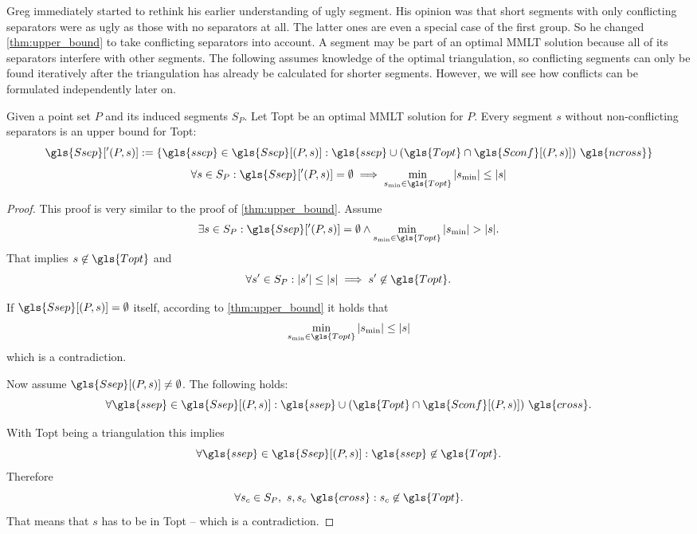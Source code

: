 Greg immediately started to rethink his earlier understanding of ugly
segment. His opinion was that short segments with only conflicting
separators were as ugly as those with no separators at all. The latter
ones are even a special case of the first group. So he changed
\cref{thm:upper_bound} to take conflicting separators into account. A 
segment may be part of an optimal \gls{MMLT} solution because all of
its separators interfere with other segments. The following
assumes knowledge of the optimal triangulation, so conflicting segments 
can only be found iteratively after the triangulation has already be 
calculated for shorter segments. However, we will see how conflicts can 
be formulated independently later on.

\begin{theorem}\label{thm:tight_upper_bound}
  Given a point set \(P\) and its induced segments \(S_P\). Let
  \gls{Topt} be an optimal \gls{MMLT} solution for \(P\).
  Every segment \(s\) without non-conflicting separators is an upper
  bound for \gls{Topt}:
  \[
    \gls{Ssep}['(P,s)] := 
    \{
      \gls{ssep} \in \gls{Ssep}[(P,s)] : 
      \gls{ssep} \cup (\gls{Topt} \cap \gls{Sconf}[(P,s)])~\gls{ncross}
    \}
  \]
  \[
    \forall s \in S_P : \gls{Ssep}['(P,s)] = \emptyset \implies
    \min\limits_{s_{\min} \in \gls{Topt}} |s_{\min}| \leq |s|
  \]
\end{theorem}


\begin{proof}
  This proof is very similar to the proof of \cref{thm:upper_bound}.
  Assume
  \[
    \exists s \in S_P :
    \gls{Ssep}['(P,s)] = \emptyset
    \land \min\limits_{s_{\min} \in \gls{Topt}} |s_{\min}| > |s|.
  \]
  That implies \(s \not\in \gls{Topt}\) and
  \[
    \forall s' \in S_P : |s'| \leq |s| \implies s' \not\in \gls{Topt}.
  \]
  
  If \(\gls{Ssep}[(P,s)] = \emptyset\) itself, according to
  \cref{thm:upper_bound} it holds that
  \[ \min\limits_{s_{\min} \in \gls{Topt}} |s_{\min}| \leq |s|\]
  which is a contradiction.
  
  Now assume \(\gls{Ssep}[(P,s)] \not= \emptyset\). The
  following holds:
  \[
    \forall \gls{ssep} \in \gls{Ssep}[(P,s)] :
    \gls{ssep} \cup (\gls{Topt} \cap \gls{Sconf}[(P,s)])~\gls{cross}.
  \]
  
  With \gls{Topt} being a triangulation this implies
  \[
    \forall \gls{ssep} \in \gls{Ssep}[(P,s)] :
    \gls{ssep} \not\in \gls{Topt}.
  \]
  Therefore
  \[
    \forall s_c \in S_P,~ s, s_c~\gls{cross} : 
    s_c \not\in \gls{Topt}.
  \]
  That means that \(s\) has to be in \gls{Topt} -- which is a
  contradiction.
\end{proof}

